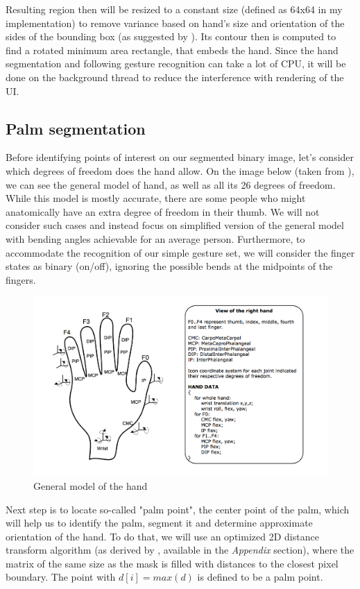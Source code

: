 \documentclass[a4paper,11pt,oneside]{article}
\begin{document}
Resulting region then will be resized to a constant size (defined as 64x64 in my implementation) to remove variance based on hand's size and orientation of the sides of the bounding box (as suggested by \cite{HI01}). Its contour then is computed to find a rotated minimum area rectangle, that embeds the hand. Since the hand segmentation and following gesture recognition can take a lot of CPU, it will be done on the background thread to reduce the interference with rendering of the UI. 

  \subsection{Palm segmentation}
  
  Before identifying points of interest on our segmented binary image, let's consider which degrees of freedom does the hand allow. On the image below (taken from \cite{OT01}), we can see the general model of hand, as well as all its 26 degrees of freedom. While this model is mostly accurate, there are some people who might anatomically have an extra degree of freedom in their thumb. We will not consider such cases and instead focus on simplified version of the general model with bending angles achievable for an average person. Furthermore, to accommodate the recognition of our simple gesture set, we will consider the finger states as binary (on/off), ignoring the possible bends at the midpoints of the fingers.\\
  
  \begin{figure}[H]
  \centering
  \includegraphics[scale=0.47]{hand-dof.png}
\caption{General model of the hand}
\end{figure}

Next step is to locate so-called "palm point", the center point of the palm, which will help us to identify the palm, segment it and determine approximate orientation of the hand. To do that, we will use an optimized 2D distance transform algorithm (as derived by \cite{DT01}, available in the \textit{Appendix} section), where the matrix of the same size as the mask is filled with distances to the closest pixel boundary. The point with $d[i] = max(d)$ is defined to be a palm point.\\
\end{document}
